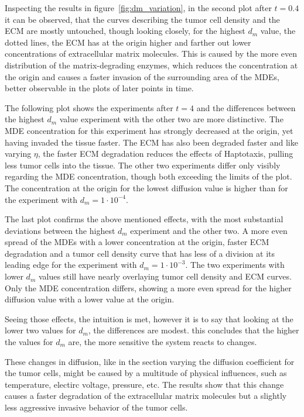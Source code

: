 Inspecting the results in figure~\ref{fig:dm_variation}, in the second plot after $t=0.4$ it can be observed, that the curves describing the tumor cell density and the ECM are mostly untouched, though looking closely, for the highest $d_m$ value, the dotted lines, the ECM has at the origin higher and farther out lower concentrations of extracellular matrix molecules. This is caused by the more even distribution of the matrix-degrading enzymes, which reduces the concentration at the origin and causes a faster invasion of the surrounding area of the MDEs, better observable in the plots of later points in time.

The following plot shows the experiments after $t=4$ and the differences between the highest $d_m$ value experiment with the other two are more distinctive. The MDE concentration for this experiment has strongly decreased at the origin, yet having invaded the tissue faster. The ECM has also been degraded faster and like varying $\eta$, the faster ECM degradation reduces the effects of Haptotaxis, pulling less tumor cells into the tissue. The other two experiments differ only visibly regarding the MDE concentration, though both exceeding the limits of the plot. The concentration at the origin for the lowest diffusion value is higher than for the experiment with $d_m=1\cdot 10^{-4}$.

The last plot confirms the above mentioned effects, with the most substantial deviations between the highest $d_m$ experiment and the other two. A more even spread of the MDEs with a lower concentration at the origin, faster ECM degradation and a tumor cell density curve that has less of a division at its leading edge for the experiment with $d_m=1\cdot 10^{-3}$. The two experiments with lower $d_m$ values still have nearly overlaying tumor cell density and ECM curves. Only the MDE concentration differs, showing a more even spread for the higher diffusion value with a lower value at the origin. 

Seeing those effects, the intuition is met, however it is to say that looking at the lower two values for $d_m$, the differences are modest. this concludes that the higher the values for $d_m$ are, the more sensitive the system reacts to changes.

These changes in diffusion, like in the section varying the diffusion coefficient for the tumor cells, might be caused by a multitude of physical influences, such as temperature, electirc voltage, pressure, etc. The results show that this change causes a faster degradation of the extracellular matrix molecules but a slightly less aggressive invasive behavior of the tumor cells. 

